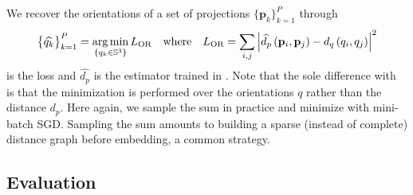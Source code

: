 We recover the orientations of a set of projections $\big\{ \mathbf{p}_k \big\}_{k=1}^P$ through
\begin{equation}
    \big\{ \widehat{q_k} \big\}_{k=1}^P = \operatorname*{arg\,min}_{\{q_k \in \mathbb{S}^3\}} L_\text{OR}
    \quad \text{where} \quad
    L_\text{OR} = \sum_{i,j} \left| \widehat{d_p} \left( \mathbf{p}_i, \mathbf{p}_j \right) - d_q\left(q_i,q_j\right) \right|^2
    \label{eqn:orientation-recovery}
\end{equation}
is the loss and $\widehat{d_p}$ is the estimator trained in .
Note that the sole difference with~ is that the minimization is performed over the orientations $q$ rather than the distance $d_p$.
Here again, we sample the sum in practice and minimize  with mini-batch SGD.
Sampling the sum amounts to building a sparse (instead of complete) distance graph before embedding, a common strategy.

\subsection{Evaluation}\label{sec:method:evaluation}


